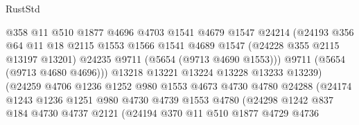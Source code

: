 \begin{lexlean}{RustStd}
\begin{coremodule}
                                @358
                                @11
                                @510
                                @1877
                                @4696
                                @4703
                                @1541
                                @4679
                                @1547
                                @24214
                                (@24193
                                  @356
                                  @64
                                  @11
                                  @18
                                  @2115
                                  @1553
                                  @1566
                                  @1541
                                  @4689
                                  @1547
                                  (@24228 @355 @2115 @13197 @13201)
                                  @24235
                                  @9711
                                  (@5654 (@9713 @4690 @1553)))
                                @9711
                                (@5654 (@9713 @4680 @4696)))
                              @13218
                              @13221
                              @13224
                              @13228
                              @13233
                              @13239)
                            (@24259
                              @4706
                              @1236
                              @1252
                              @980
                              @1553
                              @4673
                              @4730
                              @4780
                              @24288
                              (@24174
                                @1243
                                @1236
                                @1251
                                @980
                                @4730
                                @4739
                                @1553
                                @4780
                                (@24298
                                  @1242
                                  @837
                                  @184
                                  @4730
                                  @4737
                                  @2121
                                  (@24194
                                    @370
                                    @11
                                    @510
                                    @1877
                                    @4729
                                    @4736

\end{coremodule}
\end{lexlean}
